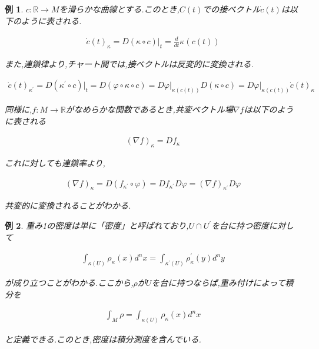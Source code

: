 \documentclass{jsarticle}
\newtheorem{exm}{例}
\begin{document}
\begin{exm}
  
$c:\mathbb{R} \to M$を滑らかな曲線とする.このとき,$C(t)$での接ベクトル$\dot{c}(t)$は以下のように表される.

\begin{align}
\dot{c}(t)_\kappa=D(\kappa \circ c)\rvert_t=\frac{d}{dt}\kappa(c(t))
\end{align}

また,連鎖律より,チャート間では,接ベクトルは反変的に変換される.

\begin{align}
\dot{c}(t)_{\kappa^\prime} =D(\kappa^\prime \circ c)\rvert_t=D(\varphi \circ \kappa \circ c)=D\varphi\rvert_{\kappa(c(t))}D(\kappa\circ c)= D\varphi\rvert_{\kappa(c(t))}\dot{c}(t)_\kappa
\end{align}

同様に,$f:M\to\mathbb{R}$がなめらかな関数であるとき,共変ベクトル場$\nabla f$は以下のように表される

\begin{align}
(\nabla f)_\kappa =Df_\kappa
\end{align}

これに対しても連鎖率より,

\begin{align}
(\nabla f)_\kappa =D(f_{\kappa^\prime}\circ \varphi)=Df_{\kappa^\prime} D\varphi =(\nabla f)_{\kappa^\prime}D\varphi
\end{align}

共変的に変換されることがわかる.

\end{exm}

\begin{exm}
  
重み1の密度は単に「密度」と呼ばれており,$U \cap U^\prime$を台に持つ密度に対して

\begin{align}
\int_{\kappa(U)}\rho_\kappa(x)d^nx=\int_{\kappa^\prime(U)}\rho_\kappa^\prime(y)d^ny
\end{align}

が成り立つことがわかる.ここから,$\rho$が$U$を台に持つならば,重み付けによって積分を

\begin{align}
\int_M \rho=\int_{\kappa(U)}\rho_\kappa (x)d^nx
\end{align}

と定義できる.このとき,密度は積分測度を含んでいる.

\end{exm}
\end{document}
